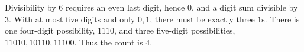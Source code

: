 Divisibility by $6$ requires an even last digit, hence $0$, and a digit sum divisible by $3$. With at most five digits and only $0,1$, there must be exactly three $1$s. There is one four-digit possibility, $1110$, and three five-digit possibilities, $11010,10110,11100$. Thus the count is $\boxed4$.
